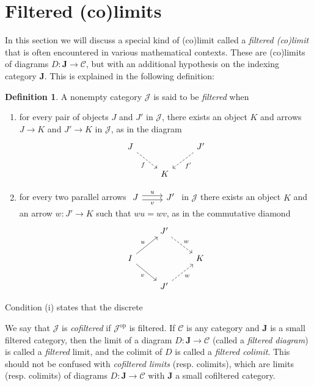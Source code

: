 \documentclass[10pt,oneside]{book}
\def\~#1{\mathscr{#1}}
\newcommand{\op}{\mathrm{op}}
\theoremstyle{plain}
\theoremstyle{definition}
\newtheorem{defn}[thm]{Definition}
\theoremstyle{remark}
\numberwithin{equation}{section}
\numberwithin{figure}{section}
\begin{document}
\section{Filtered (co)limits}

In this section we will discuss a special kind of (co)limit called a \emph{filtered (co)limit} that is often encountered in various mathematical contexts. These are (co)limits of diagrams $D: \mathbf{J} \to \~C$, but with an additional hypothesis on the indexing category $\mathbf{J}$. This is explained in the following definition:
\begin{defn}
\label{defn:filtered_limits}
    A nonempty category $\~J$ is said to be \emph{filtered} when
    \begin{enumerate}[label=(\roman*)]
        \item for every pair of objects $J$ and $J'$ in $\~J$, there exists an object $K$ and arrows $J \to K$ and $J' \to K$ in $\~J$, as in the diagram
        \[\begin{tikzcd}
            J && {J'} \\
            & K
            \arrow["f"', dashed, from=1-1, to=2-2]
            \arrow["{f'}", dashed, from=1-3, to=2-2]
        \end{tikzcd}\]
        \item for every two parallel arrows $\begin{tikzcd}
            J & {J'}
            \arrow["u", shift left, from=1-1, to=1-2]
            \arrow["v"', shift right, from=1-1, to=1-2]
        \end{tikzcd}$ in $\~J$ there exists an object $K$ and an arrow $w: J' \to K$ such that $wu = wv$, as in the commutative diamond
        \[\begin{tikzcd}
                & {J'} \\
                I && K \\
                & J'
                \arrow["w", dashed, from=1-2, to=2-3]
                \arrow["u", from=2-1, to=1-2]
                \arrow["v"', from=2-1, to=3-2]
                \arrow["w"', dashed, from=3-2, to=2-3]
            \end{tikzcd}\]
    \end{enumerate}
    Condition (i) states that the discrete 



    We say that $\~J$ is \emph{cofiltered} if $\~J^\op$ is filtered. If $\~C$ is any category and $\mathbf{J}$ is a small filtered category, then the limit of a diagram $D: \mathbf{J} \to \~C$ (called a \emph{filtered diagram}) is called a \emph{filtered} limit, and the colimit of $D$ is called a \emph{filtered colimit}. This should not be confused with \emph{cofiltered limits} (resp. colimits), which are limits (resp. colimits) of diagrams $D: \mathbf{J} \to \~C$ with $\mathbf{J}$ a small cofiltered category.
\end{defn}
\end{document}
